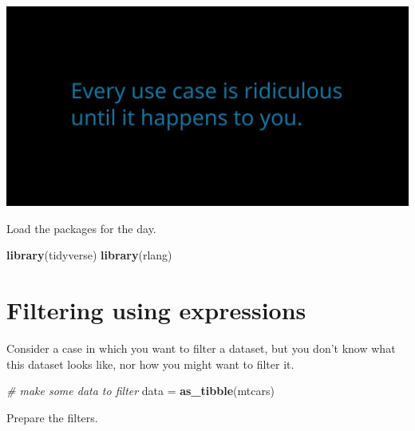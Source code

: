 \documentclass[]{book}
\newenvironment{Shaded}{}{}
\newcommand{\CommentTok}[1]{\textcolor[rgb]{0.38,0.63,0.69}{\textit{#1}}}
\newcommand{\KeywordTok}[1]{\textcolor[rgb]{0.00,0.44,0.13}{\textbf{#1}}}
\newcommand{\NormalTok}[1]{#1}
\newcommand{\StringTok}[1]{\textcolor[rgb]{0.25,0.44,0.63}{#1}}
\begin{document}
\includegraphics{opening-image.png}

Load the packages for the day.

\begin{Shaded}
\begin{Highlighting}[]
\KeywordTok{library}\NormalTok{(tidyverse)}
\KeywordTok{library}\NormalTok{(rlang)}
\end{Highlighting}
\end{Shaded}

\hypertarget{filtering-using-expressions}{%
\section{Filtering using expressions}\label{filtering-using-expressions}}

Consider a case in which you want to filter a dataset, but you don't know what this dataset looks like, nor how you might want to filter it.

\begin{Shaded}
\begin{Highlighting}[]
\CommentTok{# make some data to filter}
\NormalTok{data =}\StringTok{ }\KeywordTok{as_tibble}\NormalTok{(mtcars)}
\end{Highlighting}
\end{Shaded}

Prepare the filters.
\end{document}
